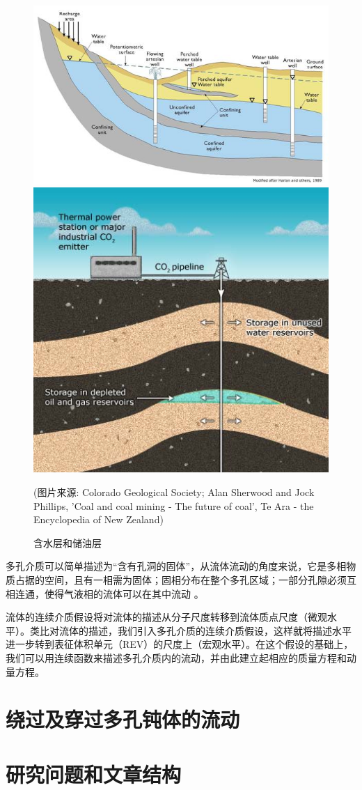 \begin{figure}
	\centering
	\includegraphics[height=.2\textheight]{figs/Aquifers}
	\includegraphics[height=.2\textheight]{figs/Oil-reservoirs}
	\caption{含水层和储油层}
	(图片来源: Colorado Geological Society; Alan Sherwood and Jock Phillips, 'Coal and coal mining - The future of coal', Te Ara - the Encyclopedia of New Zealand)
	\label{fig: Aquifers and oil reservoirs}
\end{figure}

多孔介质可以简单描述为“含有孔洞的固体”，从流体流动的角度来说，它是多相物质占据的空间，且有一相需为固体；固相分布在整个多孔区域；一部分孔隙必须互相连通，使得气液相的流体可以在其中流动 \cite{Bear2013}。

流体的连续介质假设将对流体的描述从分子尺度转移到流体质点尺度（微观水平）。类比对流体的描述，我们引入多孔介质的连续介质假设，这样就将描述水平进一步转到表征体积单元（REV）的尺度上（宏观水平）。在这个假设的基础上，我们可以用连续函数来描述多孔介质内的流动，并由此建立起相应的质量方程和动量方程。

\section{绕过及穿过多孔钝体的流动}

\section{研究问题和文章结构}
